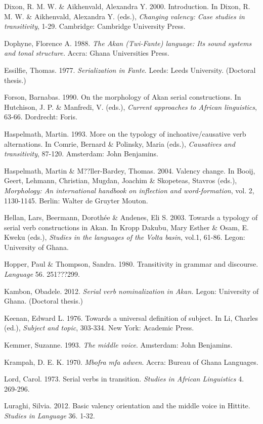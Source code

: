\documentclass[output=paper]{langsci/langscibook}
\begin{document}
Dixon, R. M. W. \& Aikhenvald, Alexandra Y. 2000. Introduction. In Dixon, R. M. W. \& Aikhenvald, Alexandra Y. (eds.), \textit{Changing valency: Case studies in transitivity}, 1-29. Cambridge: Cambridge University Press.

Dophyne, Florence A. 1988. \textit{The Akan (Twi-Fante) language: Its sound systems and tonal structure.} Accra: Ghana Universities Press.

Essilfie, Thomas. 1977. \textit{Serialization in Fante}. Leeds: Leeds University. (Doctoral thesis.)

Forson, Barnabas. 1990. On the morphology of Akan serial constructions. In Hutchison, J. P. \& Manfredi, V. (eds.), \textit{Current approaches to African linguistics}, 63-66. Dordrecht: Foris.

Haspelmath, Martin. 1993. More on the typology of inchoative/causative verb alternations. In Comrie, Bernard \& Polinsky, Maria (eds.), \textit{Causatives and transitivity}, 87-120. Amsterdam: John Benjamins.

Haspelmath, Martin \& M??ller-Bardey, Thomas. 2004. Valency change. In Booij, Geert, Lehmann, Christian, Mugdan, Joachim \& Skopeteas, Stavros (eds.), \textit{Morphology: An international handbook on inflection and word-formation}, vol. 2, 1130-1145. Berlin: Walter de Gruyter Mouton.

Hellan, Lars, Beermann, Doroth\'{e}e \& Andenes, Eli S. 2003. Towards a typology of serial verb constructions in Akan. In Kropp Dakubu, Mary Esther \& Osam, E. Kweku (eds.), \textit{Studies in the languages of the Volta basin}, vol.1, 61-86. Legon: University of Ghana.

Hopper, Paul \& Thompson, Sandra. 1980. Transitivity in grammar and discourse. \textit{Language} 56. 251???299.

Kambon, Obadele. 2012. \textit{Serial verb nominalization in Akan.} Legon: University of Ghana. (Doctoral thesis.)

Keenan, Edward L. 1976. Towards a universal definition of subject. In Li, Charles (ed.), \textit{Subject and topic}, 303-334. New York: Academic Press.

Kemmer, Suzanne. 1993. \textit{The middle voice}. Amsterdam: John Benjamins.

Krampah, D. E. K. 1970. \emph{Mbofra mfa adwen}. Accra: Bureau of Ghana Languages.

Lord, Carol. 1973. Serial verbs in transition. \textit{Studies in African Linguistics} 4. 269-296.

Luraghi, Silvia. 2012. Basic valency orientation and the middle voice in Hittite. \textit{Studies in Language} 36. 1-32.
\end{document}
